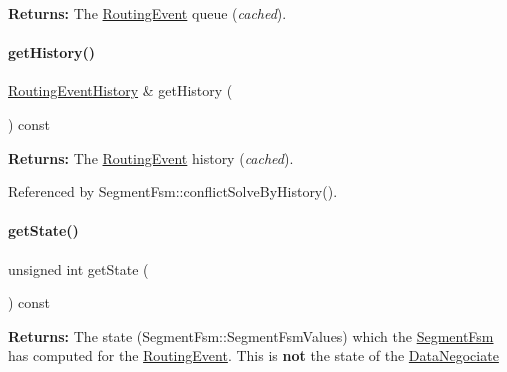 {\bfseries Returns\+:} The \mbox{\hyperlink{classKite_1_1RoutingEvent}{Routing\+Event}} queue ({\itshape cached}). \mbox{\label{classKite_1_1SegmentFsm_a1bf115c7f375168ec89ec400d58440b4}} 
\paragraph{\texorpdfstring{get\+History()}{getHistory()}}
{\footnotesize\ttfamily \mbox{\hyperlink{classKite_1_1RoutingEventHistory}{Routing\+Event\+History}} \& get\+History (\begin{DoxyParamCaption}{ }\end{DoxyParamCaption}) const\hspace{0.3cm}{\ttfamily [inline]}}

{\bfseries Returns\+:} The \mbox{\hyperlink{classKite_1_1RoutingEvent}{Routing\+Event}} history ({\itshape cached}). 

Referenced by Segment\+Fsm\+::conflict\+Solve\+By\+History().

\mbox{\label{classKite_1_1SegmentFsm_a40ec2b23684a0e6e6d7ac9783a269037}} 
\paragraph{\texorpdfstring{get\+State()}{getState()}}
{\footnotesize\ttfamily unsigned int get\+State (\begin{DoxyParamCaption}{ }\end{DoxyParamCaption}) const\hspace{0.3cm}{\ttfamily [inline]}}

{\bfseries Returns\+:} The state (Segment\+Fsm\+::\+Segment\+Fsm\+Values) which the \mbox{\hyperlink{classKite_1_1SegmentFsm}{Segment\+Fsm}} has computed for the \mbox{\hyperlink{classKite_1_1RoutingEvent}{Routing\+Event}}. This is {\bfseries not} the state of the \mbox{\hyperlink{classKite_1_1DataNegociate}{Data\+Negociate}} \mbox{\label{classKite_1_1SegmentFsm_ad272e2f3fbbddcd6c8dc2f0187f08c4e}} 
